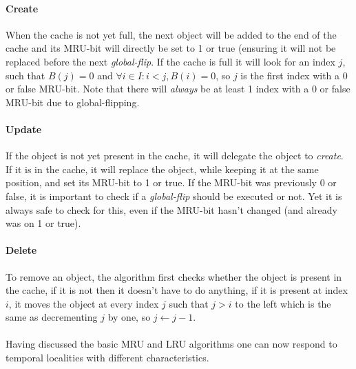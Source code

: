 \documentclass[pdftex,a4paper,12pt,twoside]{report}
\begin{document}
\paragraph{Create} When the cache is not yet full, the next object will be added to the end of the cache and its MRU-bit will directly be set to 1 or true (ensuring it will not 
be replaced before the next \emph{global-flip}. If the cache is full it will look for an index $j$, such that $B(j) = 0$ and $\forall i \in I : i < j, B(i) = 0$, so $j$ is the first index with a 0 or false MRU-bit. Note that there will \emph{always} be at least 1 index with a 0 or false MRU-bit due to global-flipping.
\paragraph{Update} If the object is not yet present in the cache, it will delegate the object to \emph{create}. If it is in the cache, it will replace the object, while keeping it at the same position, and set its MRU-bit to 1 or true. If the MRU-bit was previously 0 or false, it is important to check if a \emph{global-flip} should be executed or not. Yet it is always safe to check for this, even if the MRU-bit hasn't changed (and already was on 1 or true).
\paragraph{Delete} To remove an object, the algorithm first checks whether the object is present in the cache, if it is not then it doesn't have to do anything, if it is present at index $i$, it moves the object at every index $j$ such that $j > i$ to the left which is the same as decrementing $j$ by one, so $j \leftarrow j - 1$.
\\\\
\citep{guan2014wcet} Having discussed the basic MRU and LRU algorithms one can now respond to temporal localities with different characteristics.
\end{document}
